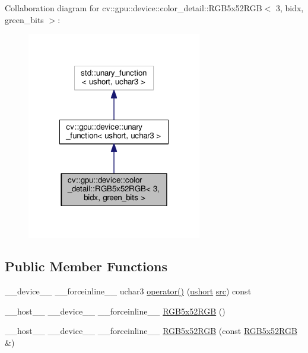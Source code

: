 Collaboration diagram for cv\-:\-:gpu\-:\-:device\-:\-:color\-\_\-detail\-:\-:R\-G\-B5x52\-R\-G\-B$<$ 3, bidx, green\-\_\-bits $>$\-:\nopagebreak
\begin{figure}[H]
\begin{center}
\leavevmode
\includegraphics[width=216pt]{structcv_1_1gpu_1_1device_1_1color__detail_1_1RGB5x52RGB_3_013_00_01bidx_00_01green__bits_01_4__coll__graph}
\end{center}
\end{figure}
\subsection*{Public Member Functions}
\begin{DoxyCompactItemize}
\item 
\-\_\-\-\_\-device\-\_\-\-\_\- \-\_\-\-\_\-forceinline\-\_\-\-\_\- uchar3 \hyperlink{structcv_1_1gpu_1_1device_1_1color__detail_1_1RGB5x52RGB_3_013_00_01bidx_00_01green__bits_01_4_a54aac6a5891de59c566f5a7b7990d117}{operator()} (\hyperlink{core_2types__c_8h_ab95f123a6c9bcfee6a343170ef8c5f69}{ushort} \hyperlink{legacy_8hpp_a371cd109b74033bc4366f584edd3dacc}{src}) const 
\item 
\-\_\-\-\_\-host\-\_\-\-\_\- \-\_\-\-\_\-device\-\_\-\-\_\- \-\_\-\-\_\-forceinline\-\_\-\-\_\- \hyperlink{structcv_1_1gpu_1_1device_1_1color__detail_1_1RGB5x52RGB_3_013_00_01bidx_00_01green__bits_01_4_a871ffc16331b5dffebb7c77bbcd4b38e}{R\-G\-B5x52\-R\-G\-B} ()
\item 
\-\_\-\-\_\-host\-\_\-\-\_\- \-\_\-\-\_\-device\-\_\-\-\_\- \-\_\-\-\_\-forceinline\-\_\-\-\_\- \hyperlink{structcv_1_1gpu_1_1device_1_1color__detail_1_1RGB5x52RGB_3_013_00_01bidx_00_01green__bits_01_4_ac2b29e73ed667fbdbdb54aabf8d0e47e}{R\-G\-B5x52\-R\-G\-B} (const \hyperlink{structcv_1_1gpu_1_1device_1_1color__detail_1_1RGB5x52RGB}{R\-G\-B5x52\-R\-G\-B} \&)
\end{DoxyCompactItemize}


